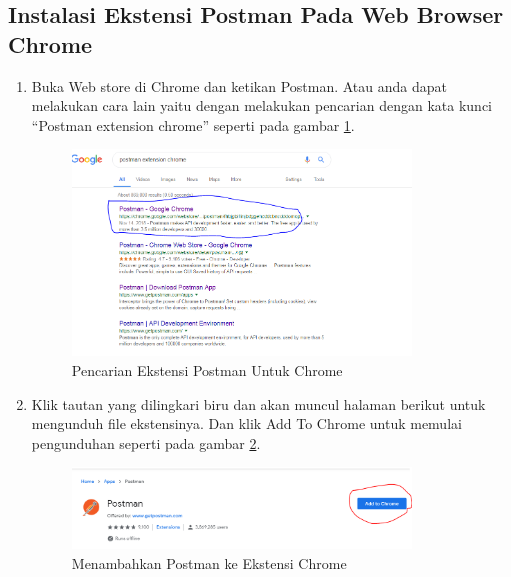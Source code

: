 \subsection{Instalasi Ekstensi Postman Pada Web Browser Chrome}
\begin{enumerate}
\item Buka Web store di Chrome dan ketikan Postman. Atau anda dapat melakukan cara lain yaitu dengan melakukan pencarian dengan kata kunci “Postman extension chrome” seperti pada gambar \ref{fig:pepc}.
\begin{figure}[!htbp]
	\centerline{\includegraphics[width=0.85\textwidth]{figures/11/pepc.PNG}}
	\caption{Pencarian Ekstensi Postman Untuk Chrome}
	\label{fig:pepc}
\end{figure}

\item Klik tautan yang dilingkari biru dan akan muncul halaman berikut untuk mengunduh file ekstensinya. Dan klik Add To Chrome untuk memulai pengunduhan seperti pada gambar \ref{fig:pec}.
\begin{figure}[!htbp]
	\centerline{\includegraphics[width=0.85\textwidth]{figures/11/pec.PNG}}
	\caption{Menambahkan Postman ke Ekstensi Chrome}
	\label{fig:pec}
\end{figure}


\end{enumerate}
